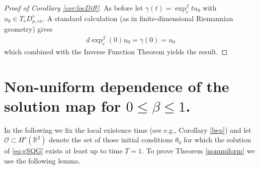 \documentclass[11pt]{amsart}
\numberwithin{equation}{section}
\begin{document}
\begin{proof}[Proof of Corollary \ref{cor:locDiff}]
As before let $\gamma(t)=\exp_e^{\beta}tu_0$ with $u_0\in T_eD_{\mu,ex}^s$. A standard calculation (as in finite-dimensional Riemannian geometry) gives 
\begin{align}\label{e:dexp}
    d\exp_e^{\beta}(0)u_0=\dot\gamma(0)=u_0
\end{align}
which combined with the Inverse Function Theorem yields the result.
\end{proof}


\section{Non-uniform dependence of the solution map for $0\le \beta\le 1$.}\label{section_nonuniform}
In the following we fix the local existence time (see e.g., Corollary \ref{lwp}) and let 
$\mathcal{O} \subset H^s(\mathbb{R}^2)$ 
denote the set of those initial conditions $\theta_0$ for which the solution of \eqref{eq:gSQG} exists at least up to time $T=1$. 
To prove Theorem \ref{nonuniform} we use 
the following lemma. 
\end{document}
